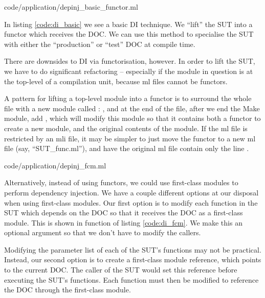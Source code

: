 
 {code/application/depinj_basic_functor.ml}

In listing \ref{code:di_basic} we see a basic DI technique. We
``lift'' the SUT into a functor which receives the DOC. We can use
this method to specialise the SUT with either the ``production'' or
``test'' DOC at compile time.

There are downsides to DI via functorisation, however. In order to
lift the SUT, we have to do significant refactoring -- especially if
the module in question is at the top-level of a compilation unit,
because ml files cannot be functors.

A pattern for lifting a top-level module into a functor is to surround
the whole file with a new module called :
, and at the end of the file,
after we end the Make module, add , which will
modify this module so that it contains both a functor to create a new
module, and the original contents of the module. If the ml file is
restricted by an mli file, it may be simpler to just move the functor
to a new ml file (say, ``SUT\_func.ml''), and have the original ml
file contain only the line .

 {code/application/depinj_fcm.ml}

Alternatively, instead of using functors, we could use first-class
modules to perform dependency injection. We have a couple different
options at our disposal when using first-class modules. Our first
option is to modify each function in the SUT which depends on the DOC
so that it receives the DOC as a first-class module. This is shown in
function  of listing \ref{code:di_fcm}. We make this an
optional argument so that we don't have to modify the callers.

Modifying the parameter list of each of the SUT's functions may not be
practical. Instead, our second option is to create a first-class
module reference, which points to the current DOC. The caller of the
SUT would set this reference before executing the SUT's
functions. Each function must then be modified to reference the DOC
through the first-class module.

